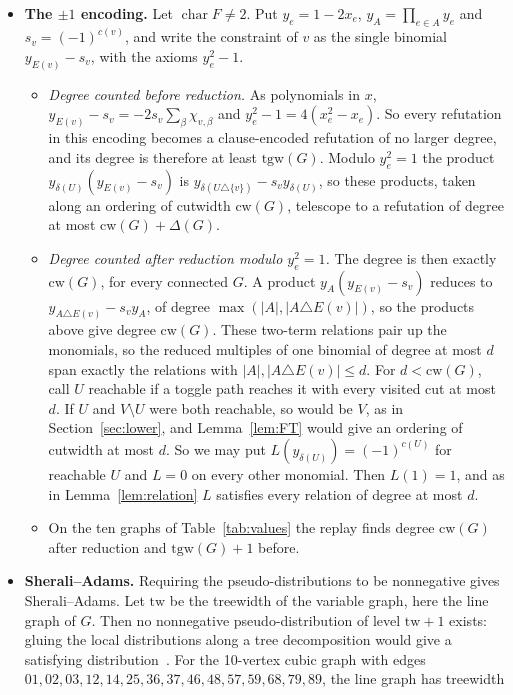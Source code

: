 \documentclass[11pt]{article}
\theoremstyle{definition}
\theoremstyle{remark}
\newcommand{\tgw}{\mathrm{tgw}}
\newcommand{\cw}{\mathrm{cw}}
\newcommand{\ch}{\operatorname{char}}
\begin{document}
\begin{itemize}
\item \textbf{The $\pm1$ encoding.} Let $\ch F\ne2$. Put $y_e=1-2x_e$,
$y_A=\prod_{e\in A}y_e$ and $s_v=(-1)^{c(v)}$, and write the constraint of $v$
as the single binomial $y_{E(v)}-s_v$, with the axioms $y_e^2-1$.
\begin{itemize}
\item \emph{Degree counted before reduction.} As polynomials in $x$,
$y_{E(v)}-s_v=-2s_v\sum_\beta\chi_{v,\beta}$ and $y_e^2-1=4(x_e^2-x_e)$. So
every refutation in this encoding becomes a clause-encoded refutation of no
larger degree, and its degree is therefore at least $\tgw(G)$. Modulo $y_e^2=1$ the product
$y_{\delta(U)}(y_{E(v)}-s_v)$ is $y_{\delta(U\triangle\{v\})}-s_vy_{\delta(U)}$,
so these products, taken along an ordering of cutwidth $\cw(G)$, telescope to
a refutation of degree at most $\cw(G)+\Delta(G)$.
\item \emph{Degree counted after reduction modulo $y_e^2=1$.} The degree is
then exactly $\cw(G)$, for every connected $G$. A product
$y_A(y_{E(v)}-s_v)$ reduces to $y_{A\triangle E(v)}-s_vy_A$, of degree
$\max(|A|,|A\triangle E(v)|)$, so the products above give degree $\cw(G)$.
These two-term relations pair up the monomials, so the reduced multiples of
one binomial of degree at most $d$ span exactly the relations with
$|A|,|A\triangle E(v)|\le d$. For $d<\cw(G)$, call $U$ reachable if a toggle
path reaches it with every visited cut at most $d$. If $U$ and
$V\setminus U$ were both reachable, so would be $V$, as in Section~\ref{sec:lower}, and
Lemma~\ref{lem:FT} would give an ordering of cutwidth at most $d$. So we may
put $L(y_{\delta(U)})=(-1)^{c(U)}$ for reachable $U$ and $L=0$ on every other
monomial. Then $L(1)=1$, and as in Lemma~\ref{lem:relation} $L$ satisfies every
relation of degree at most $d$.
\item On the ten graphs of Table~\ref{tab:values} the replay finds degree
$\cw(G)$ after reduction and $\tgw(G)+1$ before.
\end{itemize}
\item \textbf{Sherali--Adams.} Requiring the pseudo-distributions to be
nonnegative gives Sherali--Adams. Let $\mathrm{tw}$ be the treewidth of the
variable graph, here the line graph of $G$. Then no nonnegative
pseudo-distribution of level $\mathrm{tw}+1$ exists: gluing the local
distributions along a tree decomposition would give a satisfying
distribution~\cite{WJ04}. For the 10-vertex cubic graph with edges
$01,02,03,12,14,25,36,37,46,48,57,59,68,79,89$, the line graph has treewidth

\end{itemize}
\end{document}
